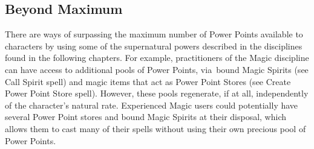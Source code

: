 \subsection{Beyond Maximum}
There are ways of surpassing the maximum number of Power Points available to characters by using some of the supernatural powers described in the disciplines found in the following chapters. For example, practitioners of the Magic discipline can have access to additional pools of Power Points, via bound Magic Spirits (see Call Spirit spell) and magic items that act as Power Point Stores (see Create Power Point Store spell). However, these pools regenerate, if at all, independently of the character’s natural rate. Experienced Magic users could potentially have several Power Point stores and bound Magic Spirits at their disposal, which allows them to cast many of their spells without using their own precious pool of Power Points.


